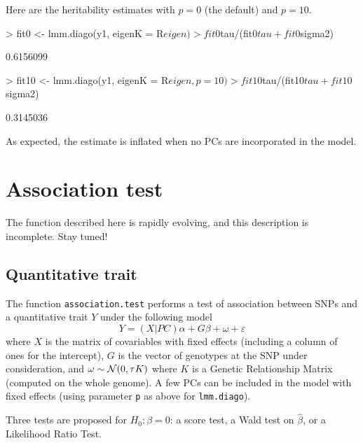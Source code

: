 \documentclass{article}
\renewenvironment{Schunk}{\vspace{\topsep}}{\vspace{\topsep}}
\begin{document}
  Here are the heritability estimates with $p = 0$ (the default) and $p = 10$.
\begin{Schunk}
\begin{Sinput}
> fit0 <- lmm.diago(y1, eigenK = R$eigen)
> fit0$tau/(fit0$tau+fit0$sigma2)
\end{Sinput}
\begin{Soutput}
[1] 0.6156099
\end{Soutput}
\begin{Sinput}
> fit10 <- lmm.diago(y1, eigenK = R$eigen, p = 10)
> fit10$tau/(fit10$tau+fit10$sigma2)
\end{Sinput}
\begin{Soutput}
[1] 0.3145036
\end{Soutput}
\end{Schunk}

  As expected, the estimate is inflated when no PCs are incorporated in the model.
 
\vfill\eject
\section{Association test}

The function described here is rapidly evolving, and this description is incomplete. 
Stay tuned!

\subsection{Quantitative trait}

  The function \verb!association.test! performs a test of association between SNPs 
  and a quantitative trait $Y$ under the following model
\begin{equation*}
  Y = (X|PC)\alpha + G\beta + \omega + \varepsilon 
\end{equation*}
  where $X$ is the matrix of covariables with fixed effects (including a column 
  of ones for the intercept), $G$ is the vector of genotypes at the SNP under
  consideration, and $\omega\sim\mathcal{N}(0,\tau K)$ where $K$ is a Genetic Relationship
  Matrix (computed on the whole genome). A few PCs can be included in the model
  with fixed effects (using parameter \verb!p! as above for \verb!lmm.diago!).

  Three tests are proposed for $H_0: \beta = 0$: a score test, a Wald test on $\widehat\beta$,
  or a Likelihood Ratio Test.
\end{document}
